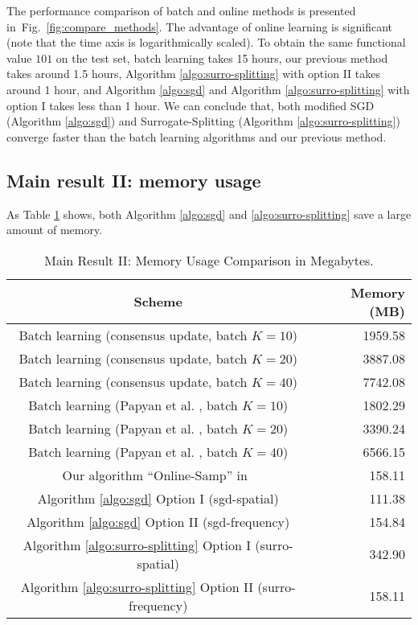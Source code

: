 \documentclass[final]{siamart1116}
\newcommand{\fig}[1]{Fig.~\ref{fig:#1}}
\begin{document}
The performance comparison of batch and online methods is presented in~\fig{compare_methods}. The advantage of online learning is significant (note
 that the time axis is logarithmically scaled). To obtain the same functional value $101$ on the test set, batch learning takes 15 hours, our previous method~\cite{liu-2017-online} takes around 1.5 hours, Algorithm \ref{algo:surro-splitting} with option II takes around 1 hour, and Algorithm \ref{algo:sgd} and Algorithm \ref{algo:surro-splitting} with option I takes less than 1 hour. We can conclude that, both modified SGD (Algorithm \ref{algo:sgd}) and Surrogate-Splitting (Algorithm \ref{algo:surro-splitting}) converge faster than the batch learning algorithms and our previous method.

\subsection{Main result II: memory usage}

As Table \ref{tab:memory} shows, both Algorithm \ref{algo:sgd} and \ref{algo:surro-splitting} save a large amount of memory.
\begin{table}[t]
\centering
\begin{tabular}{|c|r|}
\hline
Scheme & Memory (MB) \\
\hline \hline
Batch learning (consensus update, batch $K=10$) & 1959.58\\
\hline
Batch learning (consensus update, batch $K=20$)& 3887.08\\
\hline
Batch learning  (consensus update, batch $K=40$)& 7742.08 \\
\hline
Batch learning  (Papyan et al. \cite{papyan2017convolutional}, batch $K=10$) & 1802.29\\
\hline
Batch learning  (Papyan et al. \cite{papyan2017convolutional}, batch $K=20$)& 3390.24\\
\hline
Batch learning  (Papyan et al. \cite{papyan2017convolutional}, batch $K=40$)& 6566.15 \\
\hline
Our algorithm ``Online-Samp'' in~\cite{liu-2017-online} & 158.11 \\
\hline
Algorithm \ref{algo:sgd} Option I (sgd-spatial) & 111.38 \\
\hline
Algorithm \ref{algo:sgd} Option II (sgd-frequency) & 154.84 \\
\hline
Algorithm \ref{algo:surro-splitting} Option I (surro-spatial) & 342.90 \\
\hline
Algorithm \ref{algo:surro-splitting} Option II (surro-frequency) & 158.11 \\
\hline
\end{tabular}
\caption{Main Result II: Memory Usage Comparison in Megabytes.
}
\label{tab:memory}
\end{table}
\end{document}
